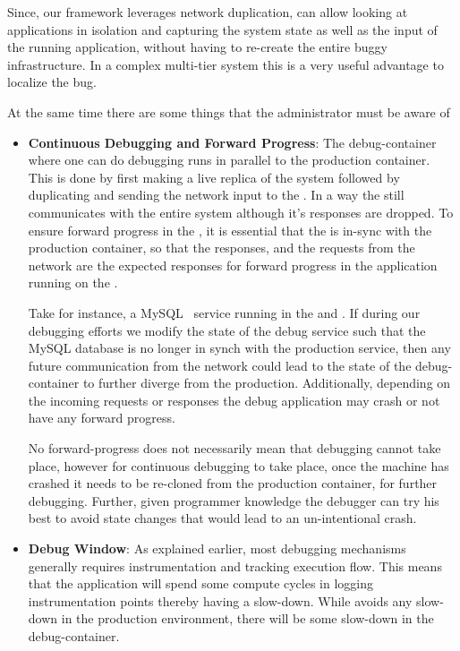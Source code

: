 \begin{itemize}
	Since, our framework leverages network duplication, \parikshan can allow looking at applications in isolation and capturing the system state as well as the input of the running application, without having to re-create the entire buggy infrastructure. 
	In a complex multi-tier system this is a very useful advantage to localize the bug.
	
	
\end{itemize}

At the same time there are some things that the administrator must be aware of

\begin{itemize}
	\item \textbf{Continuous Debugging and Forward Progress}:
	The debug-container where one can do debugging runs in parallel to the production container. This is done by first making a live replica of the system followed by duplicating and sending the network input to the \debugcontainer. 
	In a way the \debugcontainer still communicates with the entire system although it's responses are dropped. 
	To ensure forward progress in the \debugcontainer, it is essential that the \debugcontainer is in-sync with the production container, so that the responses, and the requests from the network are the expected responses for forward progress in the application running on the \debugcontainer.
	
	Take for instance, a MySQL~\cite{mysql} service running in the \productioncontainer and \debugcontainer. If during our debugging efforts we modify the state of the debug service such that the MySQL database is no longer in synch with the production service, then any future communication from the network could lead to the state of the debug-container to further diverge from the production. Additionally, depending on the incoming requests or responses the debug application may crash or not have any forward progress.
	
	No forward-progress does not necessarily mean that debugging cannot take place, however for continuous debugging to take place, once the machine has crashed it needs to be re-cloned from the production container, for further debugging. Further, given programmer knowledge the debugger can try his best to avoid state changes that would lead to an un-intentional crash.
	
	\item \textbf{Debug Window}:
	As explained earlier, most debugging mechanisms generally requires instrumentation and tracking execution flow. This means that the application will spend some compute cycles in logging instrumentation points thereby having a slow-down. While \parikshan avoids any slow-down in the production environment, there will be some slow-down in the debug-container. 
	

\end{itemize}
